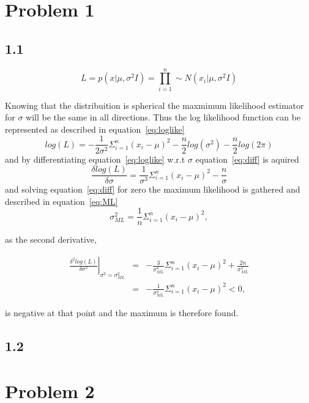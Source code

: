 \documentclass{article}
\begin{document}





\section*{Problem 1}
\subsection*{1.1}

\begin{equation}
L = p(x|\mu,\sigma^2I) = \prod_{i=1}^n \sim  {N}(x_i|\mu,\sigma^2I)
\label{eq:likelihood}
\end{equation}


\noindent Knowing that the distribuition is spherical the maxmimum likelihood estimator for $\sigma$ will be the same in all directions. Thus the log likelihood function can be represented as described in equation~\ref{eq:loglike}
\begin{equation}
log(L) =-\frac{1}{2\sigma^2}\Sigma_{i=1}^n(x_i-\mu)^2 - \frac{n}{2}log(\sigma^2) - \frac{n}{2}log(2\pi)
\label{eq:loglike}
\end{equation}
and by differentiating equation~\ref{eq:loglike} w.r.t $\sigma$ equation~\ref{eq:diff} is aquired
\begin{equation}
	\frac{\delta log(L)}{\delta \sigma} = \frac{1}{\sigma^3}\Sigma_{i=1}^n(x_i-\mu)^2 - \frac{n}{\sigma}
	\label{eq:diff}
\end{equation}
and solving equation~\ref{eq:diff} for zero the maximum likelihood is gathered and described in equation~\ref{eq:ML}
\begin{equation}
	\sigma_{ML}^2 = \frac{1}{n}\Sigma_{i=1}^n(x_i-\mu)^2,
	\label{eq:ML}
\end{equation}

as the second derivative,

\begin{equation}
\begin{array}{rcl}
\left.\frac{\delta^2 log(L)}{\delta\sigma^2}\right|_{\sigma^2=\sigma_{ML}^2} & = & -\frac{3}{\sigma^4_{ML}}\Sigma_{i=1}^{n}(x_i-\mu)^2+\frac{2n}{\sigma^2_{ML}}\\
& = & -\frac{1}{\sigma^4_{ML}}\Sigma_{i=1}^{n}(x_i-\mu)^2 < 0,
\end{array}
\end{equation}

is negative at that point and the maximum is therefore found.

\subsection*{1.2}

\newpage 

\section*{Problem 2}
\end{document}
